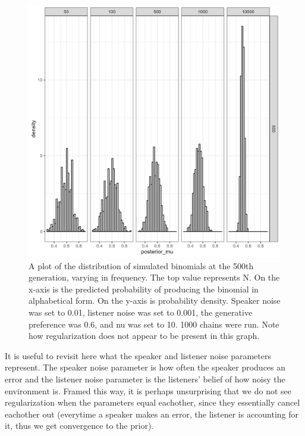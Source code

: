 \documentclass[
  jou,floatsintext]{apa6}
\begin{document}
\begin{figure}

{\centering \includegraphics[width=1\linewidth]{Figures/speaker_noise_01_listener_001} 

}

\caption{A plot of the distribution of simulated binomials at the 500th generation, varying in frequency. The top value represents N. On the x-axis is the predicted probability of producing the binomial in alphabetical form. On the y-axis is probability density. Speaker noise was set to 0.01, listener noise was set to 0.001, the generative preference was 0.6, and nu was set to 10. 1000 chains were run. Note how regularization does not appear to be present in this graph.}\label{fig:regularizationplot2}
\end{figure}

It is useful to revisit here what the speaker and listener noise parameters represent. The speaker noise parameter is how often the speaker produces an error and the listener noise parameter is the listeners' belief of how noisy the environment is. Framed this way, it is perhaps unsurprising that we do not see regularization when the parameters equal eachother, since they essentially cancel eachother out (everytime a speaker makes an error, the listener is accounting for it, thus we get convergence to the prior).
\end{document}
